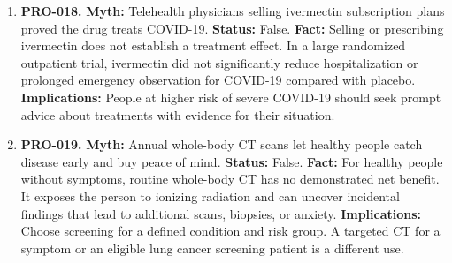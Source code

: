\documentclass[11pt,oneside]{book}
\begin{document}
\begin{enumerate}[leftmargin=0pt,labelwidth=0pt,labelsep=0pt,itemindent=0pt]
\item[] \textbf{PRO-018.} \textbf{Myth:} Telehealth physicians selling ivermectin subscription plans proved the drug treats COVID-19.\newline
\textbf{Status:} False.\newline
\textbf{Fact:} Selling or prescribing ivermectin does not establish a treatment effect. In a large randomized outpatient trial, ivermectin did not significantly reduce hospitalization or prolonged emergency observation for COVID-19 compared with placebo. \cite{ref494}\newline
\textbf{Implications:} People at higher risk of severe COVID-19 should seek prompt advice about treatments with evidence for their situation.
\item[] \textbf{PRO-019.} \textbf{Myth:} Annual whole-body CT scans let healthy people catch disease early and buy peace of mind.\newline
\textbf{Status:} False.\newline
\textbf{Fact:} For healthy people without symptoms, routine whole-body CT has no demonstrated net benefit. It exposes the person to ionizing radiation and can uncover incidental findings that lead to additional scans, biopsies, or anxiety. \cite{ref495}\newline
\textbf{Implications:} Choose screening for a defined condition and risk group. A targeted CT for a symptom or an eligible lung cancer screening patient is a different use.
\end{enumerate}
\end{document}
